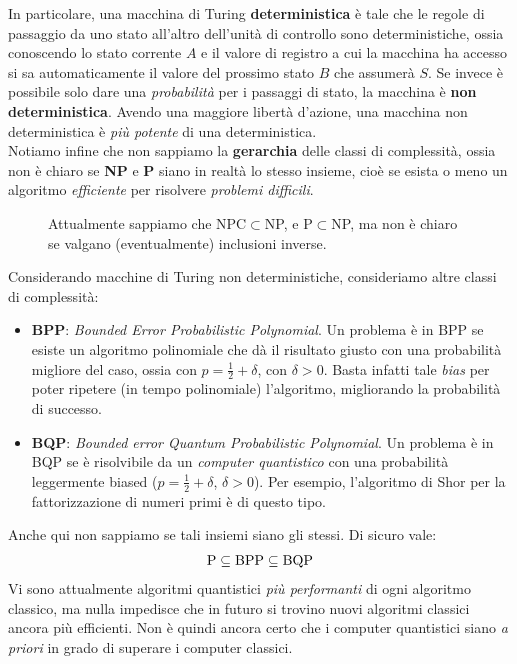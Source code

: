 \documentclass[../../InformazioneQuantistica.tex]{subfiles}
\begin{document}
In particolare, una macchina di Turing \textbf{deterministica} è tale che le regole di passaggio da uno stato all'altro dell'unità di controllo sono deterministiche, ossia conoscendo lo stato corrente $A$ e il valore di registro a cui la macchina ha accesso si sa automaticamente il valore del prossimo stato $B$ che assumerà $S$. Se invece è possibile solo dare una \textit{probabilità} per i passaggi di stato, la macchina è \textbf{non deterministica}. Avendo una maggiore libertà d'azione, una macchina non deterministica è \textit{più potente} di una deterministica.\\

Notiamo infine che non sappiamo la \textbf{gerarchia} delle classi di complessità, ossia non è chiaro se \textbf{NP} e \textbf{P} siano in realtà lo stesso insieme, cioè se esista o meno un algoritmo \textit{efficiente} per risolvere \textit{problemi difficili}. 

\begin{figure}[H]
\centering

\caption{Attualmente sappiamo che NPC$\subset$NP, e P$\subset$NP, ma non è chiaro se valgano (eventualmente) inclusioni inverse.\label{fig:n-np-npc}}
\end{figure}

Considerando macchine di Turing non deterministiche, consideriamo altre classi di complessità:
\begin{itemize}
\item \textbf{BPP}: \textit{Bounded Error Probabilistic Polynomial}. Un problema è in BPP se esiste un algoritmo polinomiale che dà il risultato giusto con una probabilità migliore del caso, ossia con $p=\frac{1}{2}+\delta$, con $\delta >0$. Basta infatti tale \textit{bias} per poter ripetere (in tempo polinomiale) l'algoritmo, migliorando  la probabilità di successo.
\item \textbf{BQP}: \textit{Bounded error Quantum Probabilistic Polynomial}. Un problema è in BQP se è risolvibile da un \textit{computer quantistico} con una probabilità leggermente biased ($p=\frac{1}{2}+\delta$, $\delta >0$). Per esempio, l'algoritmo di Shor per la fattorizzazione di numeri primi è di questo tipo.
\end{itemize}

Anche qui non sappiamo se tali insiemi siano gli stessi. Di sicuro vale:
\begin{align*}
\operatorname{P} \subseteq \operatorname{BPP} \subseteq \operatorname{BQP}
\end{align*}
Vi sono attualmente algoritmi quantistici \textit{più performanti} di ogni algoritmo classico, ma nulla impedisce che in futuro si trovino nuovi algoritmi classici ancora più efficienti. Non è quindi ancora certo che i computer quantistici siano \textit{a priori} in grado di superare i computer classici.
\end{document}
